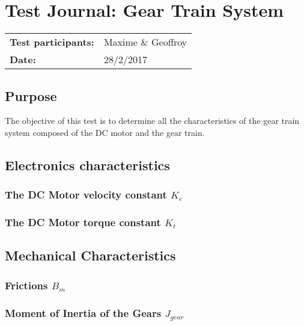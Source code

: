 \graphicspath{{figures/appendix/"Motor&GearTests"/}}
\chapter{Test Journal: Gear Train System}\label{appendix:DCMotorInductance}
\begin{table}[htbp]
\begin{tabular}{l l}
\textbf{Test participants:} & Maxime \& Geoffroy  \\
\textbf{Date:}  & 28/2/2017
\end{tabular}
\end{table}

\section*{Purpose}
The objective of this test is to determine all the characteristics of the gear train system composed of the DC motor and the gear train.
\section{Electronics characteristics}



\subsection{The DC Motor velocity constant $K_e$}\label{sec:MeasKe}



\subsection{The DC Motor torque constant $K_t$}\label{sec:MeasKt}


\section{Mechanical Characteristics}

\subsection{Frictions $B_m$}\label{sec:MeasBm}


\subsection{Moment of Inertia of the Gears $J_{gear}$}\label{sec:MeasJg}




